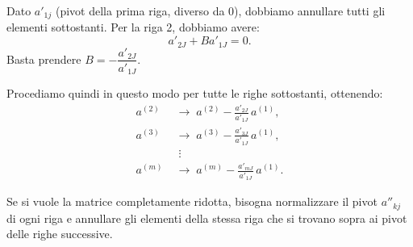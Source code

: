 {\begin{itemize}
    Dato \(a'_{1j}\) (pivot della prima riga, diverso da 0), dobbiamo annullare tutti gli elementi sottostanti.  
    Per la riga 2, dobbiamo avere:
    \[
        a'_{2J} + B a'_{1J} = 0.
    \]
    Basta prendere \(B = -\dfrac{a'_{2J}}{a'_{1J}}\).

    Procediamo quindi in questo modo per tutte le righe sottostanti, ottenendo:
    \[
    \begin{aligned}
        a^{(2)} &\;\to\; a^{(2)} - \frac{a'_{2J}}{a'_{1J}}\, a^{(1)}, \\
        a^{(3)} &\;\to\; a^{(3)} - \frac{a'_{3J}}{a'_{1J}}\, a^{(1)}, \\
        &\;\;\vdots \\
        a^{(m)} &\;\to\; a^{(m)} - \frac{a'_{mJ}}{a'_{1J}}\, a^{(1)}.
    \end{aligned}
    \]


    Se si vuole la matrice completamente ridotta, bisogna normalizzare il pivot \(a''_{kj}\) di ogni riga e annullare gli elementi della
    stessa riga che si trovano sopra ai pivot delle righe successive. 

\end{itemize}
                

}


